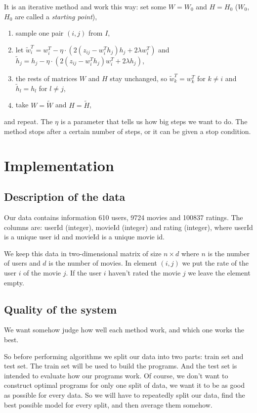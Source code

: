 \documentclass[10pt]{amsart}
\begin{document}
It is an iterative method and work this way: set some $W = W_0$ and $H = H_0$ ($W_0$, $H_0$ are called a \textit{starting point}),
\begin{enumerate}
    \item sample one pair $(i,j)$ from $I$,
    \item let $\tilde{w}_i^T = w_i^T - \eta \cdot \left(2(z_{ij} - w_i^T h_j) h_j + 2 \lambda w_i^T \right)$ and $\tilde{h}_j = h_j - \eta \cdot \left(2(z_{ij} - w_i^T  h_{j}) w_i^T + 2 \lambda h_j \right)$,
    \item the rests of matrices $W$ and $H$ stay unchanged, so $\tilde{w}_k^T = w_k^T$ for $k \neq i$ and $\tilde{h}_l = h_l$ for $l \neq j$,
    \item take $W = \tilde{W}$ and $H = \tilde{H}$,
\end{enumerate}
and repeat.
The $\eta$ is a parameter that tells us how big steps we want to do.
The method stops after a certain number of steps, or it can be given a stop condition.

\section{Implementation}

\subsection*{Description of the data}

Our data contains information 610 users, 9724 movies and 100837 ratings.
The columns are: \textsf{userId} (integer), \textsf{movieId} (integer) and \textsf{rating} (integer), where \textsf{userId} is a unique user id and \textsf{movieId} is a unique movie id.


We keep this data in two-dimensional matrix of size $n \times d$ where $n$ is the number of users and $d$ is the number of movies.
In element $(i,j)$ we put the rate of the user $i$ of the movie $j$.
If the user $i$ haven't rated the movie $j$ we leave the element empty.


\subsection*{Quality of the system}
We want somehow judge how well each method work, and which one works the best.

So before performing algorithms we split our data into two parts: train set and test set.
The train set will be used to build the programs.
And the test set is intended to evaluate how our programs work.
Of course, we don't want to construct optimal programs for only one split of data, we want it to be as good as possible for every data.
So we will have to repeatedly split our data, find the best possible model for every split, and then average them somehow.
\end{document}
